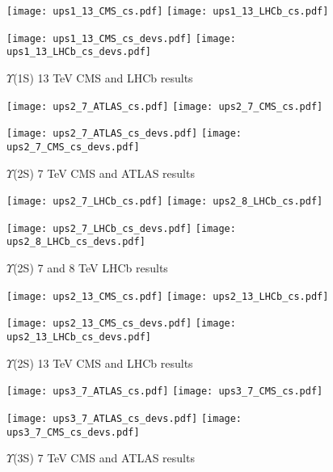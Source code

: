 \documentclass{article}
\begin{document}
\clearpage

\begin{figure}
\centering
\texttt{[image: ups1\_13\_CMS\_cs.pdf]}
\texttt{[image: ups1\_13\_LHCb\_cs.pdf]}

\texttt{[image: ups1\_13\_CMS\_cs\_devs.pdf]}
\texttt{[image: ups1\_13\_LHCb\_cs\_devs.pdf]}
\caption{$\Upsilon$(1S) 13 TeV CMS and LHCb results}
\end{figure}

\clearpage


\begin{figure}
\centering
\texttt{[image: ups2\_7\_ATLAS\_cs.pdf]}
\texttt{[image: ups2\_7\_CMS\_cs.pdf]}

\texttt{[image: ups2\_7\_ATLAS\_cs\_devs.pdf]}
\texttt{[image: ups2\_7\_CMS\_cs\_devs.pdf]}
\caption{$\Upsilon$(2S) 7 TeV CMS and ATLAS results}
\end{figure}

\clearpage

\begin{figure}
\centering
\texttt{[image: ups2\_7\_LHCb\_cs.pdf]}
\texttt{[image: ups2\_8\_LHCb\_cs.pdf]}

\texttt{[image: ups2\_7\_LHCb\_cs\_devs.pdf]}
\texttt{[image: ups2\_8\_LHCb\_cs\_devs.pdf]}
\caption{$\Upsilon$(2S) 7 and 8 TeV LHCb results}
\end{figure}

\clearpage

\begin{figure}
\centering
\texttt{[image: ups2\_13\_CMS\_cs.pdf]}
\texttt{[image: ups2\_13\_LHCb\_cs.pdf]}

\texttt{[image: ups2\_13\_CMS\_cs\_devs.pdf]}
\texttt{[image: ups2\_13\_LHCb\_cs\_devs.pdf]}
\caption{$\Upsilon$(2S) 13 TeV CMS and LHCb results}
\end{figure}

\clearpage

\begin{figure}
\centering
\texttt{[image: ups3\_7\_ATLAS\_cs.pdf]}
\texttt{[image: ups3\_7\_CMS\_cs.pdf]}

\texttt{[image: ups3\_7\_ATLAS\_cs\_devs.pdf]}
\texttt{[image: ups3\_7\_CMS\_cs\_devs.pdf]}
\caption{$\Upsilon$(3S) 7 TeV CMS and ATLAS results}
\end{figure}
\end{document}
